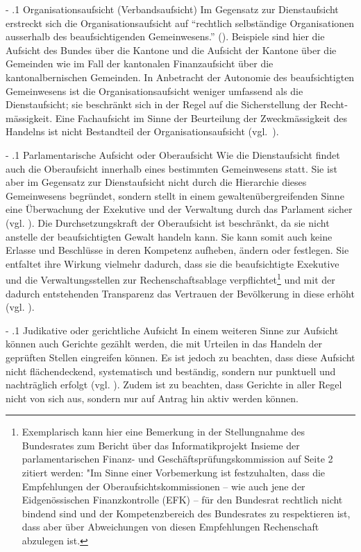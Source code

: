 \documentclass[10pt]{article}
\makeatletter
\renewcommand\subparagraph{\@startsection{subparagraph}{4}{0mm}{-\baselineskip}{.1\baselineskip}{\normalfont\normalsize\bfseries}}
\renewcommand\subparagraph{%
\@startsection{subparagraph}{4}{0mm}%
{-\baselineskip}%
{.1\baselineskip}%
{\normalfont\normalsize\bfseries}}
\makeatother
\begin{document}
\subparagraph{Organisationsaufsicht (Verbandsaufsicht)}\label{subpara:organisationsaufsicht__verbandsaufsicht_}
Im Gegensatz zur Dienstaufsicht erstreckt sich die Organisationsaufsicht auf “{}rechtlich selbständige Organisationen ausserhalb des beaufsichtigenden Gemeinwesens.”{} (\cite[S. 237]{Friederich2013}). Beispiele sind hier die Aufsicht des Bundes über die Kantone und die Aufsicht der Kantone über die Gemeinden wie im Fall der kantonalen Finanzaufsicht über die kantonalbernischen Gemeinden. In Anbetracht der Autonomie des beauf­sichtigten Gemeinwesens ist die Organisationsaufsicht weniger umfassend als die Dienstaufsicht; sie beschränkt sich in der Regel auf die Sicherstellung der Recht­mässigkeit. Eine Fachaufsicht im Sinne der Beurteilung der Zweckmässigkeit des Handelns ist nicht Bestandteil der Organisationsaufsicht (vgl.~\cite[S. 42]{Tschannen2014}).

\subparagraph{Parlamentarische Aufsicht oder Oberaufsicht}\label{subpara:parlamentarische_aufsicht_oder_oberaufsicht}
Wie die Dienstaufsicht findet auch die Oberaufsicht innerhalb eines bestimmten Gemeinwesens statt. Sie ist aber im Gegensatz zur Dienstaufsicht nicht durch die Hierarchie dieses Gemeinwesens begründet, sondern stellt in einem gewalten­übergreifenden Sinne eine Überwachung der Exekutive und der Verwaltung durch das Parlament sicher (vgl. \cite[S. 25]{Friederich2007}). Die Durchsetzungskraft der Oberaufsicht ist beschränkt, da sie nicht anstelle der beaufsichtigten Gewalt handeln kann. Sie kann somit auch keine Erlasse und Beschlüsse in deren Kompetenz aufheben, ändern oder festlegen. Sie entfaltet ihre Wirkung vielmehr dadurch, dass sie die beaufsichtigte Exekutive und die Verwaltungsstellen zur Rechenschafts­ablage verpflichtet\footnote{Exemplarisch kann hier eine Bemerkung in der Stellungnahme des Bundesrates zum Bericht über das Informatikprojekt Insieme der parlamentarischen Finanz- und Geschäftsprüfungs­kommission auf Seite 2 zitiert werden: "Im Sinne einer Vorbemerkung ist festzu­halten, dass die Empfehlungen der Oberaufsichts­kommissionen – wie auch jene der Eidgenössischen Finanzkontrolle (EFK) – für den Bundesrat rechtlich nicht bindend sind und der Kompetenz­bereich des Bundesrates zu respektieren ist, dass aber über Abweichungen von diesen Empfehlungen Rechenschaft abzulegen ist.} und mit der dadurch entstehenden Transparenz das Vertrauen der Bevölkerung in diese erhöht (vgl. \cite[S. 27]{Friederich2007}).

\subparagraph{Judikative oder gerichtliche Aufsicht}\label{subpara:judikative_oder_gerichtliche_aufsicht}
In einem weiteren Sinne zur Aufsicht können auch Gerichte gezählt werden, die mit Urteilen in das Handeln der geprüften Stellen eingreifen können. Es ist jedoch zu beachten, dass diese Aufsicht nicht flächendeckend, systematisch und beständig, sondern nur punktuell und nachträglich erfolgt (vgl. \cite[S. 34]{Thiele2014}). Zudem ist zu beachten, dass Gerichte in aller Regel nicht von sich aus, sondern nur auf Antrag hin aktiv werden können.
\end{document}

